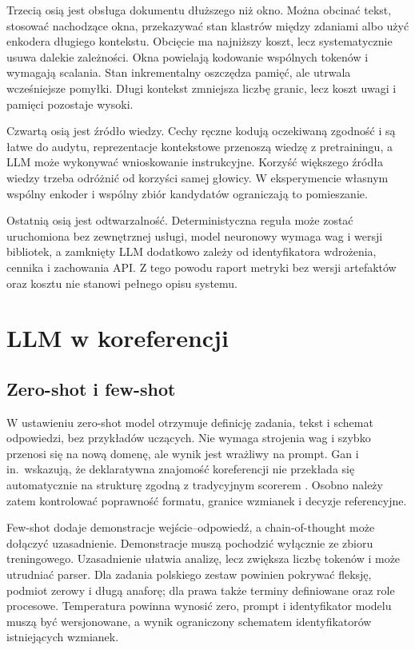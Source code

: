 Trzecią osią jest obsługa dokumentu dłuższego niż okno. Można obcinać tekst, stosować nachodzące okna, przekazywać stan klastrów między zdaniami albo użyć enkodera długiego kontekstu. Obcięcie ma najniższy koszt, lecz systematycznie usuwa dalekie zależności. Okna powielają kodowanie wspólnych tokenów i wymagają scalania. Stan inkrementalny oszczędza pamięć, ale utrwala wcześniejsze pomyłki. Długi kontekst zmniejsza liczbę granic, lecz koszt uwagi i pamięci pozostaje wysoki.

Czwartą osią jest źródło wiedzy. Cechy ręczne kodują oczekiwaną zgodność i są łatwe do audytu, reprezentacje kontekstowe przenoszą wiedzę z pretrainingu, a LLM może wykonywać wnioskowanie instrukcyjne. Korzyść większego źródła wiedzy trzeba odróżnić od korzyści samej głowicy. W eksperymencie własnym wspólny enkoder i wspólny zbiór kandydatów ograniczają to pomieszanie.

Ostatnią osią jest odtwarzalność. Deterministyczna reguła może zostać uruchomiona bez zewnętrznej usługi, model neuronowy wymaga wag i wersji bibliotek, a zamknięty LLM dodatkowo zależy od identyfikatora wdrożenia, cennika i zachowania API. Z tego powodu raport metryki bez wersji artefaktów oraz kosztu nie stanowi pełnego opisu systemu.

\section{LLM w koreferencji}
\label{sec:llm-coref}

\subsection{Zero-shot i few-shot}

W ustawieniu zero-shot model otrzymuje definicję zadania, tekst i schemat odpowiedzi, bez przykładów uczących. Nie wymaga strojenia wag i szybko przenosi się na nową domenę, ale wynik jest wrażliwy na prompt. Gan i in.\ wskazują, że deklaratywna znajomość koreferencji nie przekłada się automatycznie na strukturę zgodną z tradycyjnym scorerem \cite{gan_2024_llm_coref}. Osobno należy zatem kontrolować poprawność formatu, granice wzmianek i decyzje referencyjne.

Few-shot dodaje demonstracje wejście--odpowiedź, a chain-of-thought może dołączyć uzasadnienie. Demonstracje muszą pochodzić wyłącznie ze zbioru treningowego. Uzasadnienie ułatwia analizę, lecz zwiększa liczbę tokenów i może utrudniać parser. Dla zadania polskiego zestaw powinien pokrywać fleksję, podmiot zerowy i długą anaforę; dla prawa także terminy definiowane oraz role procesowe. Temperatura powinna wynosić zero, prompt i identyfikator modelu muszą być wersjonowane, a wynik ograniczony schematem identyfikatorów istniejących wzmianek.

